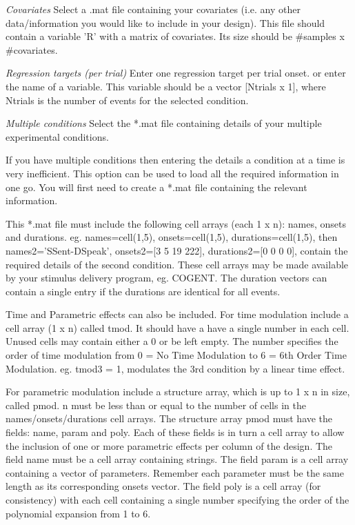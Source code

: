 \textit{Covariates}
Select a .mat file containing your covariates (i.e. any other data/information you would like to include in your design). This file should contain a variable 'R' with a matrix of covariates. Its size should be \#samples x \#covariates.


\textit{Regression targets (per trial)}
Enter one regression target per trial onset. or enter the name of a variable.  This variable should be a vector [Ntrials x 1], where Ntrials is the number of events for the selected condition.


\textit{Multiple conditions}
Select the *.mat file containing details of your multiple experimental conditions. 



If you have multiple conditions then entering the details a condition at a time is very inefficient. This option can be used to load all the required information in one go. You will first need to create a *.mat file containing the relevant information. 



This *.mat file must include the following cell arrays (each 1 x n): names, onsets and durations. eg. names=cell(1,5), onsets=cell(1,5), durations=cell(1,5), then names{2}='SSent-DSpeak', onsets{2}=[3 5 19 222], durations{2}=[0 0 0 0], contain the required details of the second condition. These cell arrays may be made available by your stimulus delivery program, eg. COGENT. The duration vectors can contain a single entry if the durations are identical for all events.



Time and Parametric effects can also be included. For time modulation include a cell array (1 x n) called tmod. It should have a have a single number in each cell. Unused cells may contain either a 0 or be left empty. The number specifies the order of time modulation from 0 = No Time Modulation to 6 = 6th Order Time Modulation. eg. tmod{3} = 1, modulates the 3rd condition by a linear time effect.



For parametric modulation include a structure array, which is up to 1 x n in size, called pmod. n must be less than or equal to the number of cells in the names/onsets/durations cell arrays. The structure array pmod must have the fields: name, param and poly.  Each of these fields is in turn a cell array to allow the inclusion of one or more parametric effects per column of the design. The field name must be a cell array containing strings. The field param is a cell array containing a vector of parameters. Remember each parameter must be the same length as its corresponding onsets vector. The field poly is a cell array (for consistency) with each cell containing a single number specifying the order of the polynomial expansion from 1 to 6.




